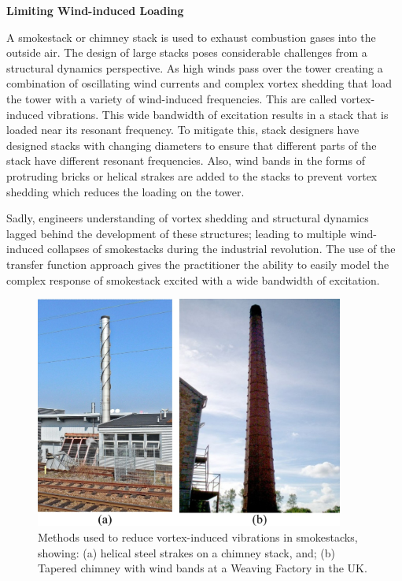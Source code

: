 \documentclass[12pt,letter]{article}
\begin{document}
		\begin{vibration_case_study}

		\textbf{Limiting Wind-induced Loading}
			
		\noindent A smokestack or chimney stack is used to exhaust combustion gases into the outside air. The design of large stacks poses considerable challenges from a structural dynamics perspective. As high winds pass over the tower creating a combination of oscillating wind currents and complex vortex shedding that load the tower with a variety of wind-induced frequencies. This are called vortex-induced vibrations\protect\footnotemark[1]. This wide bandwidth of excitation results in a stack that is loaded near its resonant frequency. To mitigate this, stack designers have designed stacks with changing diameters to ensure that different parts of the stack have different resonant frequencies. Also, wind bands in the forms of protruding bricks or helical strakes are added to the stacks to prevent vortex shedding which reduces the loading on the tower.
			
			
		Sadly, engineers understanding of vortex shedding and structural dynamics lagged behind the development of these structures; leading to multiple wind-induced collapses of smokestacks during the industrial revolution.  The use of the transfer function approach gives the practitioner the ability to easily model the complex response of smokestack excited with a wide bandwidth of excitation. 
			
			\begin{figure}[H]
				\centering
				\includegraphics[width=4in]{../figures/smokestacks}
				\caption{Methods used to reduce vortex-induced vibrations in smokestacks, showing: (a) helical steel strakes on a chimney stack\protect\footnotemark[2], and; (b) Tapered chimney with wind bands at a Weaving Factory in the UK\protect\footnotemark[3].}
			\end{figure}
			\noindent {}
		\end{vibration_case_study}
\end{document}
